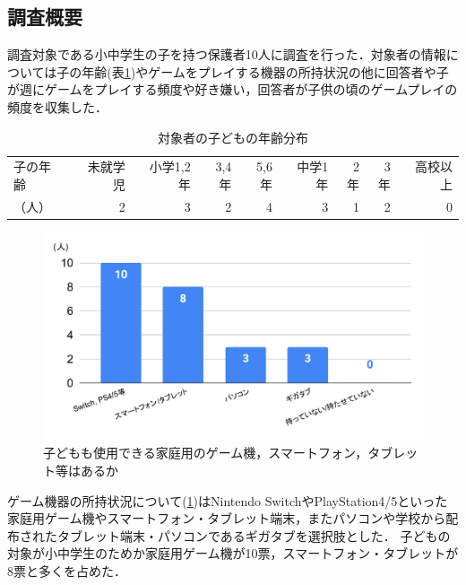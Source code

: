 \documentclass[12pt,a4j,titlepage]{ltjsarticle}
\begin{document}
\subsection{調査概要}
調査対象である小中学生の子を持つ保護者10人に調査を行った．対象者の情報については子の年齢(表\ref{table:情報})やゲームをプレイする機器の所持状況の他に回答者や子が週にゲームをプレイする頻度や好き嫌い，回答者が子供の頃のゲームプレイの頻度を収集した．

\begin{table}[H]
 \caption{対象者の子どもの年齢分布}
 \label{table:情報}
 \small
 \centering
  \begin{tabular}{lrrrrrrrr}
  \hline
   子の年齢 & 未就学児 & 小学1,2年 & 3,4年 & 5,6年 & 中学1年 & 2年 & 3年 & 高校以上\\
   （人）& 2 & 3 & 2 & 4 & 3 & 1 & 2 & 0\\
   \hline
  \end{tabular}
\end{table}

\begin{figure}[H]
 \begin{center}
  \includegraphics[keepaspectratio, scale=0.4]{chart1.pdf}
 \end{center}
 \caption{子どもも使用できる家庭用のゲーム機，スマートフォン，タブレット等はあるか}
 \label{fig:ゲーム所持}
\end{figure}

ゲーム機器の所持状況について(\ref{fig:ゲーム所持})はNintendo SwitchやPlayStation4/5といった家庭用ゲーム機やスマートフォン・タブレット端末，またパソコンや学校から配布されたタブレット端末・パソコンであるギガタブを選択肢とした．
子どもの対象が小中学生のためか家庭用ゲーム機が10票，スマートフォン・タブレットが8票と多くを占めた．
\end{document}
